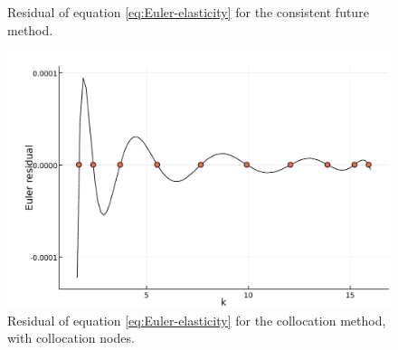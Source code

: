 \documentclass[a4paper,11pt]{article}
\newcommand{\figwidth}{\linewidth}
\begin{document}
\begin{figure}[b]
\begin{minipage}[t]{0.48\linewidth}
    \caption{Residual of equation \eqref{eq:Euler-elasticity} for the consistent future method.}
    \label{fig:euler-residual-consistentfuture}
  \end{minipage}\hfill%
  \begin{minipage}[t]{0.48\linewidth}
    \includegraphics[width=\figwidth]{../fig/eulerresid-collocation.pdf}
    \caption{Residual of equation \eqref{eq:Euler-elasticity} for the collocation method, with collocation nodes.}
    \label{fig:eulerresid-collocation}
  \end{minipage}
\end{figure}
\end{document}

